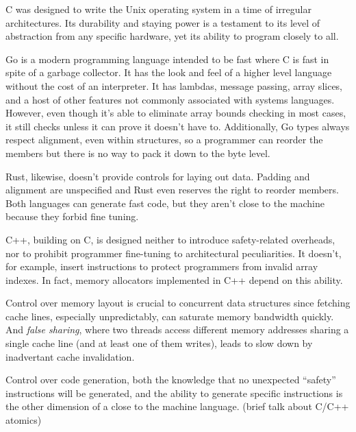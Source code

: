 C was designed to write the Unix operating system in a time of irregular architectures.  Its durability and staying power is a testament to its level of abstraction from any specific hardware, yet its ability to program closely to all.

Go is a modern programming language intended to be fast where C is fast in spite of a garbage collector.\cite{Go}  It has the look and feel of a higher level language without the cost of an interpreter.  It has lambdas, message passing, array slices, and a host of other features not commonly associated with systems languages.  However, even though it's able to eliminate array bounds checking in most cases, it still checks unless it can prove it doesn't have to.  Additionally, Go types always respect alignment, even within structures, so a programmer can reorder the members but there is no way to pack it down to the byte level.

Rust, likewise, doesn't provide controls for laying out data.  Padding and alignment are unspecified and Rust even reserves the right to reorder members.  Both languages can generate fast code, but they aren't close to the machine because they forbid fine tuning.

C++, building on C, is designed neither to introduce safety-related overheads, nor to prohibit programmer fine-tuning to architectural peculiarities.  It doesn't, for example, insert instructions to protect programmers from invalid array indexes.  In fact, memory allocators implemented in C++ depend on this ability.\cite{Hoard}\cite{TCMalloc}\cite{Supermalloc}

Control over memory layout is crucial to concurrent data structures since fetching cache lines, especially unpredictably, can saturate memory bandwidth quickly.  And \textit{false sharing}, where two threads access different memory addresses sharing a single cache line (and at least one of them writes), leads to slow down by inadvertant cache invalidation.

Control over code generation, both the knowledge that no unexpected ``safety'' instructions will be generated, and the ability to generate specific instructions is the other dimension of a close to the machine language. (brief talk about C/C++ atomics)
